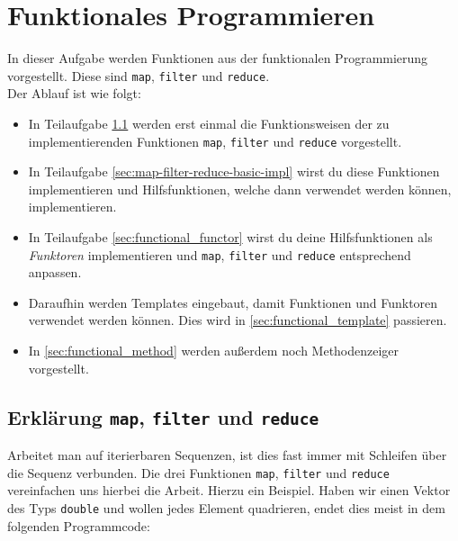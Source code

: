 \section{\ExercisePrefixAdvanced Funktionales Programmieren \experimental}

\experimentaltextbox

In dieser Aufgabe werden Funktionen aus der funktionalen Programmierung vorgestellt.
Diese sind \lstinline{map}, \lstinline{filter} und \lstinline{reduce}. \\

Der Ablauf ist wie folgt:
\begin{itemize}
    \item In Teilaufgabe \ref{sec:map-filter-reduce-intro} werden erst einmal die Funktionsweisen der zu implementierenden Funktionen \lstinline{map}, \lstinline{filter} und \lstinline{reduce} vorgestellt.
	\item In Teilaufgabe \ref{sec:map-filter-reduce-basic-impl} wirst du diese Funktionen implementieren und Hilfsfunktionen, welche dann verwendet werden können, implementieren.
	\item In Teilaufgabe \ref{sec:functional_functor} wirst du deine Hilfsfunktionen als \emph{Funktoren} implementieren und \lstinline{map}, \lstinline{filter} und \lstinline{reduce} entsprechend anpassen.
	\item Daraufhin werden Templates eingebaut, damit Funktionen und Funktoren verwendet werden können. Dies wird in \ref{sec:functional_template} passieren.
	\item In \ref{sec:functional_method} werden außerdem noch Methodenzeiger vorgestellt.
\end{itemize}

\subsection{Erklärung \lstinline{map}, \lstinline{filter} und \lstinline{reduce}}\label{sec:map-filter-reduce-intro}

Arbeitet man auf iterierbaren Sequenzen, ist dies fast immer mit Schleifen über die Sequenz verbunden.
Die drei Funktionen \lstinline{map}, \lstinline{filter} und \lstinline{reduce} vereinfachen uns hierbei die Arbeit.
Hierzu ein Beispiel.
Haben wir einen Vektor des Typs \lstinline{double} und wollen jedes Element quadrieren, endet dies meist in dem folgenden Programmcode:



